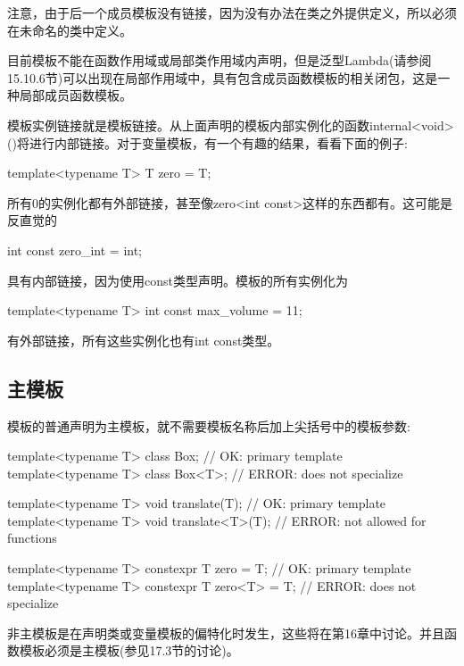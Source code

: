 注意，由于后一个成员模板没有链接，因为没有办法在类之外提供定义，所以必须在未命名的类中定义。

目前模板不能在函数作用域或局部类作用域内声明，但是泛型Lambda(请参阅15.10.6节)可以出现在局部作用域中，具有包含成员函数模板的相关闭包，这是一种局部成员函数模板。

模板实例链接就是模板链接。从上面声明的模板内部实例化的函数internal<void>()将进行内部链接。对于变量模板，有一个有趣的结果，看看下面的例子:

\begin{cpp}
template<typename T> T zero = T{};
\end{cpp}

所有0的实例化都有外部链接，甚至像zero<int const>这样的东西都有。这可能是反直觉的

\begin{cpp}
int const zero_int = int{};
\end{cpp}

具有内部链接，因为使用const类型声明。模板的所有实例化为

\begin{cpp}
template<typename T> int const max_volume = 11;
\end{cpp}

有外部链接，所有这些实例化也有int const类型。

\subsection{主模板}

模板的普通声明为主模板，就不需要模板名称后加上尖括号中的模板参数:

\begin{cpp}
template<typename T> class Box; // OK: primary template
template<typename T> class Box<T>; // ERROR: does not specialize

template<typename T> void translate(T); // OK: primary template
template<typename T> void translate<T>(T); // ERROR: not allowed for functions

template<typename T> constexpr T zero = T{}; // OK: primary template
template<typename T> constexpr T zero<T> = T{}; // ERROR: does not specialize
\end{cpp}

非主模板是在声明类或变量模板的偏特化时发生，这些将在第16章中讨论。并且函数模板必须是主模板(参见17.3节的讨论)。


















